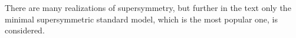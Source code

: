 There are many realizations of supersymmetry, but further in the text only the minimal supersymmetric standard model, which is the most popular one, is considered.





